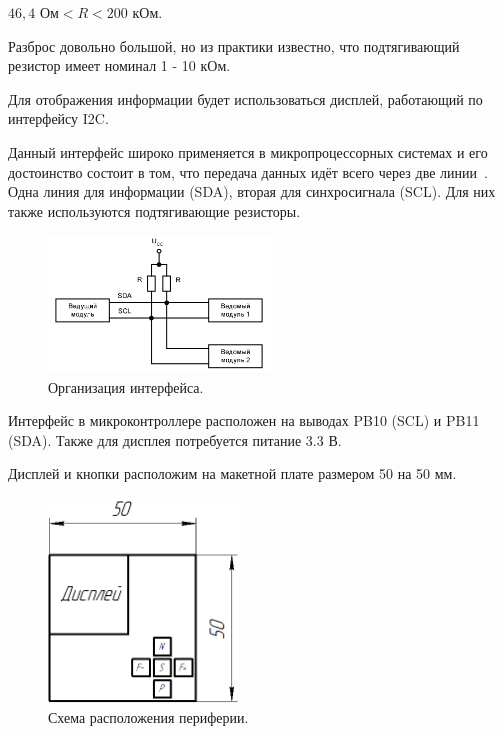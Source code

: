 \begin{center}
	$46,4$ Ом$ < R < 200$ кОм.
\end{center}	

	Разброс довольно большой, но из практики известно, что подтягивающий резистор имеет номинал 1 - 10 кОм.
	
	Для отображения информации будет использоваться дисплей, работающий по интерфейсу I2C.	
	
	Данный интерфейс широко применяется в микропроцессорных системах и его достоинство состоит в том, что передача данных идёт всего через две линии~\cite{schemat}. Одна линия для информации (SDA), вторая для синхросигнала (SCL). Для них также используются подтягивающие резисторы.
	
	\begin{figure}[H]
    \centering
    \includegraphics[width=0.525\textwidth]{../image/i2c.png}
    \caption{Организация интерфейса.}
	\end{figure}
	
	Интерфейс в микроконтроллере расположен на выводах PB10 (SCL) и PB11 (SDA). Также для дисплея потребуется питание 3.3 В.
	
	Дисплей и кнопки расположим на макетной плате размером 50 на 50 мм.
	
	\begin{figure}[H]
    \centering
    \includegraphics[width=0.45\textwidth]{../image/func_gen.png}
    \caption{Схема расположения периферии.}
	\end{figure}
	
